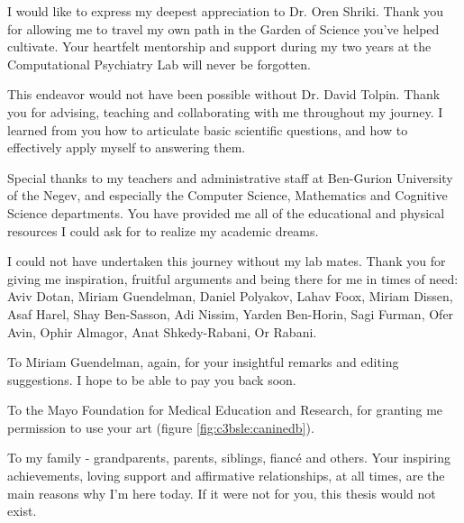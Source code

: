

\begin{doublespacing}
I would like to express my deepest appreciation to Dr. Oren Shriki. Thank you for allowing me to travel my own path in the Garden of Science you've helped cultivate. Your heartfelt mentorship and support during my two years at the Computational Psychiatry Lab will never be forgotten.

This endeavor would not have been possible without Dr. David Tolpin. Thank you for advising, teaching and collaborating with me throughout my journey. I learned from you how to articulate basic scientific questions, and how to effectively apply myself to answering them.

Special thanks to my teachers and administrative staff at Ben-Gurion University of the Negev, and especially the Computer Science, Mathematics and Cognitive Science departments. You have provided me all of the educational and physical resources I could ask for to realize my academic dreams.

I could not have undertaken this journey without my lab mates. Thank you for giving me inspiration, fruitful arguments and being there for me in times of need: Aviv Dotan, Miriam Guendelman, Daniel Polyakov, Lahav Foox, Miriam Dissen, Asaf Harel, Shay Ben-Sasson, Adi Nissim, Yarden Ben-Horin, Sagi Furman, Ofer Avin, Ophir Almagor, Anat Shkedy-Rabani, Or Rabani.

To Miriam Guendelman, again, for your insightful remarks and editing suggestions. I hope to be able to pay you back soon.

To the Mayo Foundation for Medical Education and Research, for granting me permission to use your art (figure \ref{fig:c3bsle:caninedb}).

To my family - grandparents, parents, siblings, fiancé and others. Your inspiring achievements, loving support and affirmative relationships, at all times, are the main reasons why I'm here today. If it were not for you, this thesis would not exist.

\end{doublespacing}
